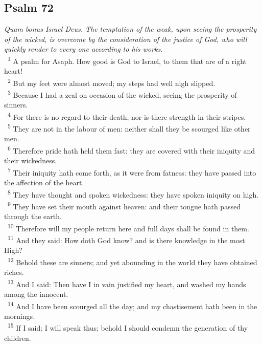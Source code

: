 \documentclass[a5paper,12pt]{article}
\begin{document}
\begin{multicols*}{2}
\section{Psalm 72}
\label{sec:org5d16544}
\emph{Quam bonus Israel Deus. The temptation of the weak, upon seeing the prosperity of the wicked, is overcome by the consideration of the justice of God, who will quickly render to every one according to his works.}\\

~\textsuperscript{1} A psalm for Asaph. How good is God to Israel, to them that are of a right heart!\\
~\textsuperscript{2} But my feet were almost moved; my steps had well nigh slipped.\\
~\textsuperscript{3} Because I had a zeal on occasion of the wicked, seeing the prosperity of sinners.\\
~\textsuperscript{4} For there is no regard to their death, nor is there strength in their stripes.\\
~\textsuperscript{5} They are not in the labour of men: neither shall they be scourged like other men.\\
~\textsuperscript{6} Therefore pride hath held them fast: they are covered with their iniquity and their wickedness.\\
~\textsuperscript{7} Their iniquity hath come forth, as it were from fatness: they have passed into the affection of the heart.\\
~\textsuperscript{8} They have thought and spoken wickedness: they have spoken iniquity on high.\\
~\textsuperscript{9} They have set their mouth against heaven: and their tongue hath passed through the earth.\\
~\textsuperscript{10} Therefore will my people return here and full days shall be found in them.\\
~\textsuperscript{11} And they said: How doth God know? and is there knowledge in the most High?\\
~\textsuperscript{12} Behold these are sinners; and yet abounding in the world they have obtained riches.\\
~\textsuperscript{13} And I said: Then have I in vain justified my heart, and washed my hands among the innocent.\\
~\textsuperscript{14} And I have been scourged all the day; and my chastisement hath been in the mornings.\\
~\textsuperscript{15} If I said: I will speak thus; behold I should condemn the generation of thy children.\\

\end{multicols*}
\end{document}
